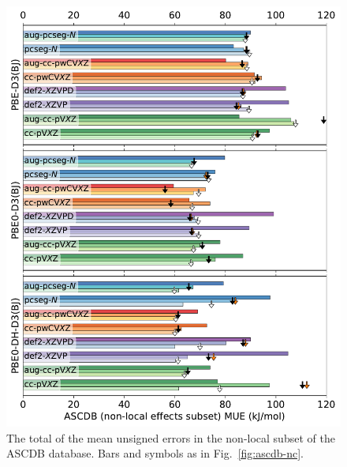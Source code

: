 \documentclass[12pt]{article}
\begin{document}
\begin{figure}[p]
    \centering
    \includegraphics[width=12cm]{../output/fig_ascdb_nl.pdf}
    \caption{The total of the mean unsigned errors in the non-local subset of the ASCDB database. Bars and symbols as in Fig.~\ref{fig:ascdb-nc}.}
\end{figure}
\end{document}
